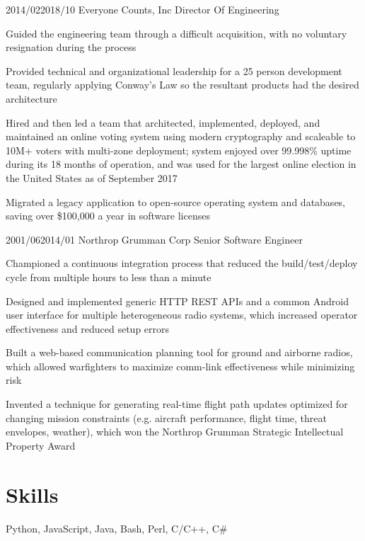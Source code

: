 \documentclass{article}
\begin{document}
\job
  {2014/02}{2018/10}
  {Everyone Counts, Inc}
  {Director Of Engineering}
  {\begin{achievements}
    \item Guided the engineering team through a difficult acquisition, with no voluntary resignation during the process
    \item Provided technical and organizational leadership for a 25 person development team, regularly applying Conway's Law so the resultant products had the desired architecture
    \item Hired and then led a team that architected, implemented, deployed, and maintained an online voting system using modern cryptography and scaleable to 10M+ voters with multi-zone deployment; system enjoyed over 99.998\% uptime during its 18 months of operation, and was used for the largest online election in the United States as of September 2017
    \item Migrated a legacy application to open-source operating system and databases, saving over \$100,000 a year in software licenses
  \end{achievements}}

\job
  {2001/06}{2014/01}
  {Northrop Grumman Corp}
  {Senior Software Engineer}
  {\begin{achievements}
    \item Championed a continuous integration process that reduced the build/test/deploy cycle from multiple hours to less than a minute
    \item Designed and implemented generic HTTP REST APIs and a common Android user interface for multiple heterogeneous radio systems, which increased operator effectiveness and reduced setup errors
    \item Built a web-based communication planning tool for ground and airborne radios, which allowed warfighters to maximize comm-link effectiveness while minimizing risk
    \item Invented a technique for generating real-time flight path updates optimized for changing mission constraints (e.g. aircraft performance, flight time, threat envelopes, weather), which won the Northrop Grumman Strategic Intellectual Property Award
  \end{achievements}}


\section{Skills}

  {Python, JavaScript, Java, Bash, Perl, C/C++, C\#}
\end{document}
